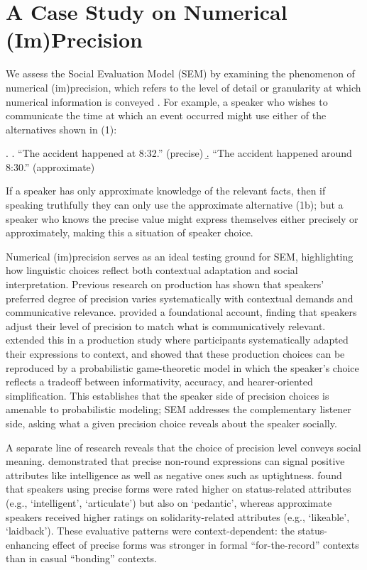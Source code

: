 \documentclass[12pt,a4paper]{article}
\begin{document}
\section{A Case Study on Numerical (Im)Precision}
\label{sec:imprecision}

We assess the Social Evaluation Model (SEM) by examining the phenomenon of
numerical (im)precision, which refers to the level of detail or granularity at
which numerical information is conveyed \citep{krifka2009}. For example, a
speaker who wishes to communicate the time at which an event occurred might use
either of the alternatives shown in (1):

\ex. \a. ``The accident happened at 8:32.'' \hfill(precise)
     \b. ``The accident happened around 8:30.'' \hfill(approximate)

\noindent If a speaker has only approximate knowledge of the relevant facts,
then if speaking truthfully they can only use the approximate alternative (1b);
but a speaker who knows the precise value might express themselves either
precisely or approximately, making this a situation of speaker choice.

Numerical (im)precision serves as an ideal testing ground for SEM, highlighting
how linguistic choices reflect both contextual adaptation and social
interpretation. Previous research on production has shown that speakers' preferred degree of
precision varies systematically with contextual demands and communicative
relevance. \citet{vanderhenst2002} provided a foundational account, finding that
speakers adjust their level of precision to match what is communicatively
relevant.
\citet{muehlenberndsolt2022} extended this in a production study where
participants systematically adapted their expressions to context, and showed that
these production choices can be reproduced by a probabilistic game-theoretic
model in which the speaker's choice reflects a tradeoff between informativity,
accuracy, and hearer-oriented simplification. This establishes that the speaker
side of precision choices is amenable to probabilistic modeling; SEM addresses
the complementary listener side, asking what a given precision choice reveals
about the speaker socially.

A separate line of research reveals that the choice of precision level conveys social
meaning. \citet{beltrama2018} demonstrated that precise non-round expressions can
signal positive attributes like intelligence as well as negative ones such as
uptightness. \citet{beltramaetal2022} found that speakers using precise forms were
rated higher on status-related attributes (e.g., `intelligent', `articulate') but
also on `pedantic', whereas approximate speakers received higher ratings on
solidarity-related attributes (e.g., `likeable', `laidback'). These evaluative
patterns were context-dependent: the status-enhancing effect of precise forms was
stronger in formal ``for-the-record'' contexts than in casual ``bonding'' contexts.
\end{document}
